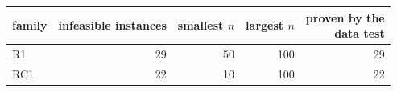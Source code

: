 \begin{tabular}{lrrrr}\toprule
family & infeasible instances & smallest $n$ & largest $n$ & \shortstack{proven by the\\data test} \\ \midrule
R1 & 29 & 50 & 100 & 29 \\
RC1 & 22 & 10 & 100 & 22 \\
\bottomrule\end{tabular}
